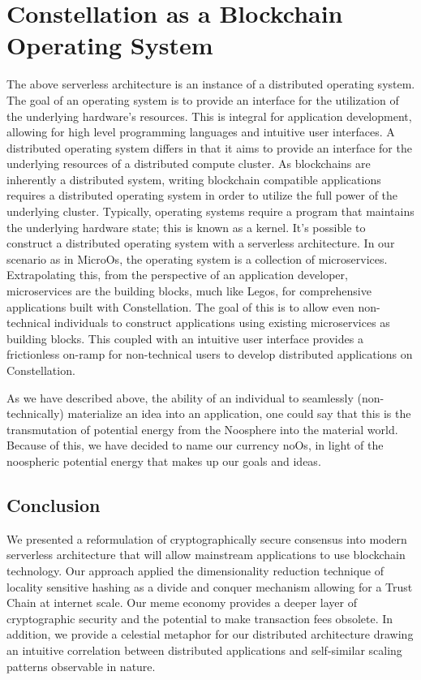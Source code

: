\documentclass{article}
\begin{document}
\section{Constellation as a Blockchain Operating System}
The above serverless architecture is an instance of a distributed operating system. The goal of an operating system is to provide an interface for the utilization of the underlying hardware's resources. This is integral for application development, allowing for high level programming languages and intuitive user interfaces. A distributed operating system differs in that it aims to provide an interface for the underlying resources of a distributed compute cluster. As blockchains are inherently a distributed system, writing blockchain compatible applications requires a distributed operating system in order to utilize the full power of the underlying cluster. Typically, operating systems require a program that maintains the underlying hardware state; this is known as a kernel. It's possible to construct a distributed operating system with a serverless architecture. In our scenario as in MicroOs, the operating system is a collection of microservices. Extrapolating this, from the perspective of an application developer, microservices are the building blocks, much like Legos, for comprehensive applications built with Constellation. The goal of this is to allow even non-technical individuals to construct applications using existing microservices as building blocks. This coupled with an intuitive user interface provides a frictionless on-ramp for non-technical users to develop distributed applications on Constellation.

As we have described above, the ability of an individual to seamlessly (non-technically) materialize an idea into an application, one could say that this is the  transmutation of potential energy from the Noosphere into the material world. Because of this, we have decided to name our currency noOs, in light of the noospheric potential energy that makes up our goals and ideas.

\subsection{Conclusion}
We presented a reformulation of cryptographically secure consensus into modern serverless architecture that will allow mainstream applications to use blockchain technology. Our approach applied the dimensionality reduction technique of locality sensitive hashing as a divide and conquer mechanism allowing for a Trust Chain at internet scale. Our meme economy provides a deeper layer of cryptographic security and the potential to make transaction fees obsolete. In addition, we provide a  celestial metaphor for our distributed architecture drawing an intuitive correlation between distributed applications and self-similar scaling patterns observable in nature.


\end{document}
